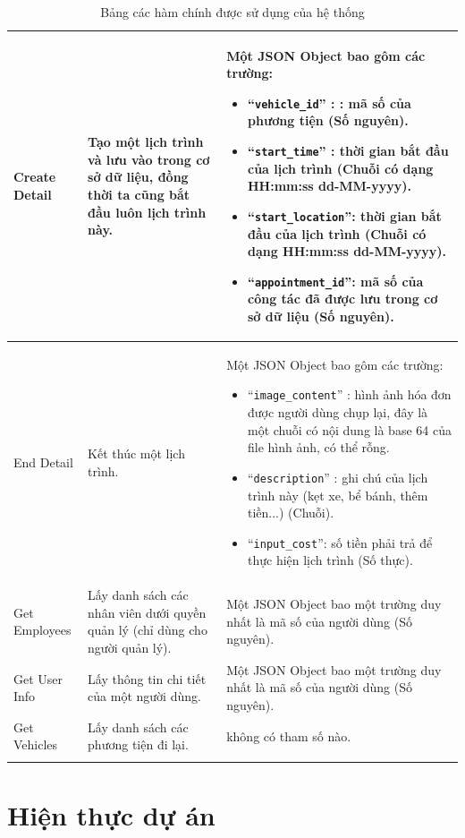 \documentclass[a4paper]{article}
\begin{document}
\begin{longtable}{ | p{} |p{} | p{}  | }
\hline
Create Detail & 
Tạo một lịch trình và lưu vào trong cơ sở dữ liệu, đồng thời ta cũng bắt đầu luôn lịch trình này. &
Một JSON Object bao gôm các trường: 
\begin{itemize}
  \item “\verb|vehicle_id|” : : mã số của phương tiện (Số nguyên).  
  \item “\verb|start_time|” : thời gian bắt đầu của lịch trình (Chuỗi  có dạng HH:mm:ss dd-MM-yyyy).
  \item “\verb|start_location|”: thời gian bắt đầu của lịch trình (Chuỗi  có dạng HH:mm:ss dd-MM-yyyy).
  \item “\verb|appointment_id|”: mã số của công tác đã được lưu trong cơ sở dữ liệu (Số  nguyên). 
\end{itemize}
\\ 


\hline
End Detail  & 
Kết thúc một lịch trình. &
Một JSON Object bao gôm các trường: 
\begin{itemize}
  \item “\verb|image_content|” : hình ảnh hóa đơn được người dùng chụp lại, đây là một chuỗi có nội dung là base 64 của file hình ảnh, có thể rỗng. 
  \item “\verb|description|” : ghi chú của lịch trình này (kẹt xe, bể bánh, thêm tiền...) (Chuỗi).
  \item “\verb|input_cost|”: số tiền phải trả để thực hiện lịch trình (Số thực).
\end{itemize}
\\ 

\hline
Get Employees & 
Lấy danh sách các nhân viên dưới quyền quản lý (chỉ dùng cho người quản lý).&
Một JSON Object bao một trường duy nhất là mã số của người dùng (Số nguyên).
\\ 

\hline
Get User Info  & 
Lấy thông tin chi tiết của một người dùng. &
Một JSON Object bao một trường duy nhất là mã số của người dùng (Số nguyên).
\\

\hline
Get Vehicles   & 
Lấy danh sách các phương tiện đi lại. &
không có tham số nào.
\\
 
\hline

\caption{Bảng các hàm chính được sử dụng của hệ thống}
\end{longtable}
\section{Hiện thực dự án}
\end{document}
